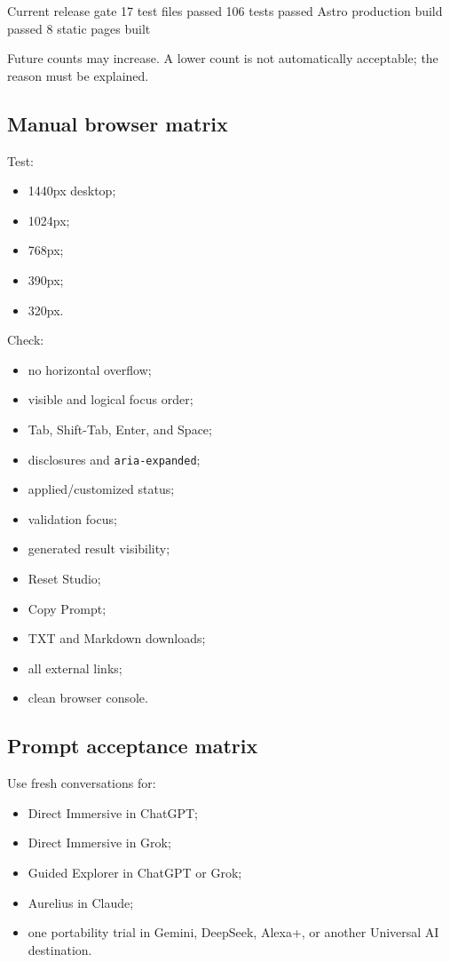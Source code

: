 \documentclass[11pt,letterpaper]{article}
\begin{document}
\begin{codebox}{Current release gate}
17 test files passed
106 tests passed
Astro production build passed
8 static pages built
\end{codebox}

Future counts may increase. A lower count is not automatically acceptable; the
reason must be explained.

\subsection{Manual browser matrix}

Test:

\begin{itemize}
    \item 1440px desktop;
    \item 1024px;
    \item 768px;
    \item 390px;
    \item 320px.
\end{itemize}

Check:

\begin{itemize}
    \item no horizontal overflow;
    \item visible and logical focus order;
    \item Tab, Shift-Tab, Enter, and Space;
    \item disclosures and \texttt{aria-expanded};
    \item applied/customized status;
    \item validation focus;
    \item generated result visibility;
    \item Reset Studio;
    \item Copy Prompt;
    \item TXT and Markdown downloads;
    \item all external links;
    \item clean browser console.
\end{itemize}

\subsection{Prompt acceptance matrix}

Use fresh conversations for:

\begin{itemize}
    \item Direct Immersive in ChatGPT;
    \item Direct Immersive in Grok;
    \item Guided Explorer in ChatGPT or Grok;
    \item Aurelius in Claude;
    \item one portability trial in Gemini, DeepSeek, Alexa+, or another
          Universal AI destination.
\end{itemize}
\end{document}
